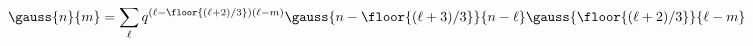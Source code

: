 \begin{equation}
\gauss{n}{m}=\sum_\ell q^{(\ell-\floor{(\ell+2)/3})(\ell-m)}
               \gauss{n-\floor{(\ell+3)/3}}{n-\ell}     \gauss{\floor{(\ell+2)/3}}{\ell-m}
\end{equation}

